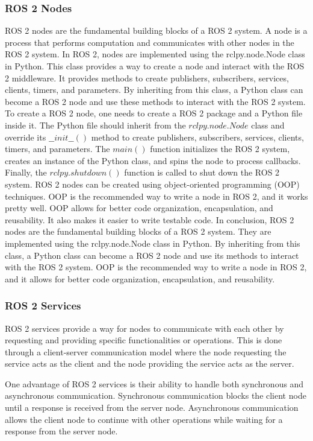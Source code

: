 \documentclass[12pt,oneside]{article}
\begin{document}
\subsubsection{ROS 2 Nodes}\label{ros2-nodes}
ROS 2 nodes are the fundamental building blocks of a ROS 2 system. A node is a process that performs computation and communicates with other nodes in the ROS 2 system. In ROS 2, nodes are implemented using the rclpy.node.Node class in Python. This class provides a way to create a node and interact with the ROS 2 middleware. It provides methods to create publishers, subscribers, services, clients, timers, and parameters. By inheriting from this class, a Python class can become a ROS 2 node and use these methods to interact with the ROS 2 system.
To create a ROS 2 node, one needs to create a ROS 2 package and a Python file inside it. The Python file should inherit from the $rclpy.node.Node$ class and override its $\_\_init\_\_()$ method to create publishers, subscribers, services, clients, timers, and parameters. The $main()$ function initializes the ROS 2 system, creates an instance of the Python class, and spins the node to process callbacks. Finally, the $rclpy.shutdown()$ function is called to shut down the ROS 2 system.\cite{ros2docs}
ROS 2 nodes can be created using object-oriented programming (OOP) techniques. OOP is the recommended way to write a node in ROS 2, and it works pretty well. OOP allows for better code organization, encapsulation, and reusability. It also makes it easier to write testable code.
In conclusion, ROS 2 nodes are the fundamental building blocks of a ROS 2 system. They are implemented using the rclpy.node.Node class in Python. By inheriting from this class, a Python class can become a ROS 2 node and use its methods to interact with the ROS 2 system. OOP is the recommended way to write a node in ROS 2, and it allows for better code organization, encapsulation, and reusability.

\subsubsection{ROS 2 Services}\label{ros2-services}
ROS 2 services provide a way for nodes to communicate with each other by requesting and providing specific functionalities or operations. This is done through a client-server communication model where the node requesting the service acts as the client and the node providing the service acts as the server.

One advantage of ROS 2 services is their ability to handle both synchronous and asynchronous communication. Synchronous communication blocks the client node until a response is received from the server node. Asynchronous communication allows the client node to continue with other operations while waiting for a response from the server node.
\end{document}
